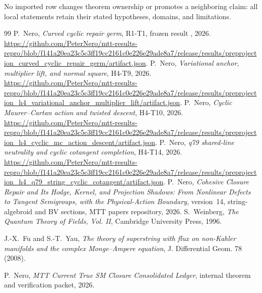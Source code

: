 \documentclass[11pt]{article}
\begin{document}
No imported row changes theorem ownership or promotes a neighboring claim: all local statements retain their stated hypotheses, domains, and limitations.

\begin{thebibliography}{99}
 P.~Nero, \emph{Curved cyclic repair germ}, R1-T1,
frozen result , 2026.
\url{https://github.com/PeterNero/mtt-results-repro/blob/f141a20ea23c5c3ff19cc2161c0e226e29ade8a7/release/results/preprojection_curved_cyclic_repair_germ/artifact.json}.
 P.~Nero, \emph{Variational anchor, multiplier lift,
and normal square}, H4-T9, 2026.
\url{https://github.com/PeterNero/mtt-results-repro/blob/f141a20ea23c5c3ff19cc2161c0e226e29ade8a7/release/results/preprojection_h4_variational_anchor_multiplier_lift/artifact.json}.
 P.~Nero, \emph{Cyclic Maurer--Cartan action and twisted
descent}, H4-T10, 2026.
\url{https://github.com/PeterNero/mtt-results-repro/blob/f141a20ea23c5c3ff19cc2161c0e226e29ade8a7/release/results/preprojection_h4_cyclic_mc_action_descent/artifact.json}.
 P.~Nero, \emph{q79 shared-line neutrality and
cyclic cotangent completion}, H4-T14, 2026.
\url{https://github.com/PeterNero/mtt-results-repro/blob/f141a20ea23c5c3ff19cc2161c0e226e29ade8a7/release/results/preprojection_h4_q79_string_cyclic_cotangent/artifact.json}.
 P.~Nero, \emph{Cohesive Closure Repair and Its Hodge,
Kernel, and Projection Shadows: From Nonlinear Defects to Tangent Semigroups,
with the Physical-Action Boundary}, version~14, string-algebroid and BV sections,
MTT papers repository, 2026.
S.~Weinberg, \emph{The Quantum Theory of Fields, Vol. II}, Cambridge
University Press, 1996.

J.-X.~Fu and S.-T.~Yau,
\emph{The theory of superstring with flux on non-Kahler manifolds and the
complex Monge--Ampere equation}, J. Differential Geom. 78 (2008).

P.~Nero, \emph{MTT Current True SM Closure Consolidated Ledger}, internal
theorem and verification packet, 2026.
\end{thebibliography}
\end{document}
